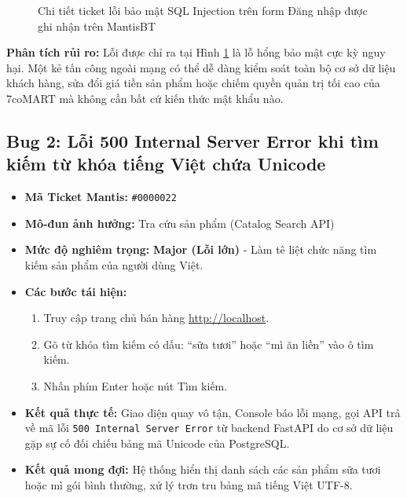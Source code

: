 \begin{figure}[H]
    \caption{Chi tiết ticket lỗi bảo mật SQL Injection trên form Đăng nhập được ghi nhận trên MantisBT}
    \label{fig:bug_sqli}
\end{figure}

\textbf{Phân tích rủi ro:} Lỗi được chỉ ra tại Hình \ref{fig:bug_sqli} là lỗ hổng bảo mật cực kỳ nguy hại. Một kẻ tấn công ngoài mạng có thể dễ dàng kiểm soát toàn bộ cơ sở dữ liệu khách hàng, sửa đổi giá tiền sản phẩm hoặc chiếm quyền quản trị tối cao của 7coMART mà không cần bất cứ kiến thức mật khẩu nào.

\subsection{Bug 2: Lỗi 500 Internal Server Error khi tìm kiếm từ khóa tiếng Việt chứa Unicode}
\begin{itemize}
    \item \textbf{Mã Ticket Mantis:} \texttt{\#0000022}
    \item \textbf{Mô-đun ảnh hưởng:} Tra cứu sản phẩm (Catalog Search API)
    \item \textbf{Mức độ nghiêm trọng:} \textbf{Major (Lỗi lớn)} - Làm tê liệt chức năng tìm kiếm sản phẩm của người dùng Việt.
    \item \textbf{Các bước tái hiện:}
    \begin{enumerate}
        \item Truy cập trang chủ bán hàng \url{http://localhost}.
        \item Gõ từ khóa tìm kiếm có dấu: ``sữa tươi'' hoặc ``mì ăn liền'' vào ô tìm kiếm.
        \item Nhấn phím Enter hoặc nút Tìm kiếm.
    \end{enumerate}
    \item \textbf{Kết quả thực tế:} Giao diện quay vô tận, Console báo lỗi mạng, gọi API trả về mã lỗi \texttt{500 Internal Server Error} từ backend FastAPI do cơ sở dữ liệu gặp sự cố đối chiếu bảng mã Unicode của PostgreSQL.
    \item \textbf{Kết quả mong đợi:} Hệ thống hiển thị danh sách các sản phẩm sữa tươi hoặc mì gói bình thường, xử lý trơn tru bảng mã tiếng Việt UTF-8.
\end{itemize}


